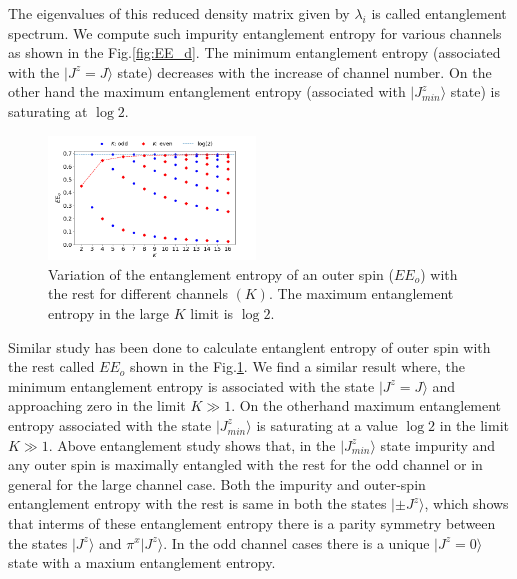 \documentclass[reprint,prb,superscriptaddress]{revtex4-1}
\begin{document}
\noindent The eigenvalues of this reduced density matrix given by $\lambda_i$ is called entanglement spectrum. We compute such impurity entanglement entropy for various channels as shown in the Fig.\ref{fig:EE_d}. The minimum entanglement entropy (associated with the $|J^z=J\rangle$ state) decreases with the increase of channel number. On the other hand the maximum entanglement entropy (associated with $|J^z_{min}\rangle$ state) is saturating at $\log 2$. 
\begin{figure}[!htpb]
\centering
\includegraphics[width=0.49\textwidth]{plt/outer_EE_multi_channel_ANN.png}
\caption{Variation of the entanglement entropy of an outer spin ($EE_o$) with the rest for different channels $(K)$. The maximum entanglement entropy in the large $K$ limit is $\log 2$.}
\label{fig:EE_outer}
\end{figure}
Similar study has been done to calculate entanglent entropy of outer spin with the rest called $EE_o$ shown in the Fig.\ref{fig:EE_outer}.
%
%
We find a similar result where, the minimum entanglement entropy is associated with the state $|J^z=J\rangle$ and approaching zero in the limit $K\gg 1$. On the otherhand maximum entanglement entropy associated with the state $|J^z_{min}\rangle$ is saturating at a value $\log 2$ in the limit $K\gg 1$. Above entanglement study shows that, in the $|J^z_{min}\rangle$ state impurity and any outer spin is maximally entangled with the rest for the odd channel or in general for the large channel case. Both the impurity and outer-spin entanglement entropy with the rest is same in both the states $|\pm J^z\rangle$, which shows that interms of these entanglement entropy there is a parity symmetry between the states $|J^z\rangle$ and $\pi^{x} |J^z\rangle$. In the odd channel cases there is a unique $|J^z=0\rangle$ state with a maxium entanglement entropy. 
\end{document}
